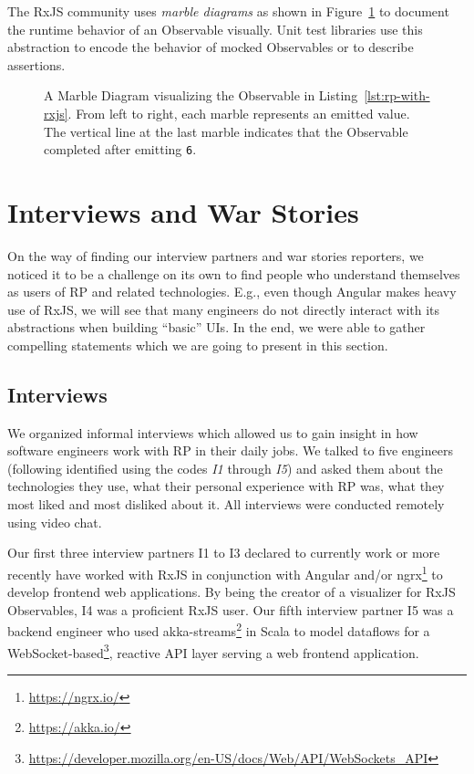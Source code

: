 \documentclass[12pt,a4paper]{article}
\begin{document}
The RxJS community uses \emph{marble diagrams} as shown in Figure~\ref{fig:marble-diagram} to document \cite{marblediagrams} the runtime behavior of an Observable visually. Unit test libraries\cite{marbletesting} use this abstraction to encode the behavior of mocked Observables or to describe assertions.

\begin{figure}[H]
	\centering
	\caption{A Marble Diagram visualizing the Observable in Listing~\ref{lst:rp-with-rxjs}. From left to right, each marble represents an emitted value. The vertical line at the last marble indicates that the Observable completed after emitting \texttt{6}.}
	\label{fig:marble-diagram}
\end{figure}


\section{Interviews and War Stories}
\label{sec:interviews}

On the way of finding our interview partners and war stories reporters, we noticed it to be a challenge on its own to find people who understand themselves as users of RP and related technologies. E.g., even though Angular makes heavy use of RxJS, we will see that many engineers do not directly interact with its abstractions when building ``basic'' UIs. In the end, we were able to gather compelling statements which we are going to present in this section.

\subsection{Interviews}

We organized informal interviews which allowed us to gain insight in how software engineers work with RP in their daily jobs. We talked to five engineers (following identified using the codes \emph{I1} through \emph{I5}) and asked them about the technologies they use, what their personal experience with RP was, what they most liked and most disliked about it. All interviews were conducted remotely using video chat.

Our first three interview partners I1 to I3 declared to currently work or more recently have worked with RxJS in conjunction with Angular and/or ngrx\footnote{\url{https://ngrx.io/}} to develop frontend web applications. By being the creator of a visualizer for RxJS Observables, I4 was a proficient RxJS user. Our fifth interview partner I5 was a backend engineer who used akka-streams\footnote{\url{https://akka.io/}} in Scala to model dataflows for a WebSocket-based\footnote{\url{https://developer.mozilla.org/en-US/docs/Web/API/WebSockets_API}}, reactive API layer serving a web frontend application.
\end{document}

